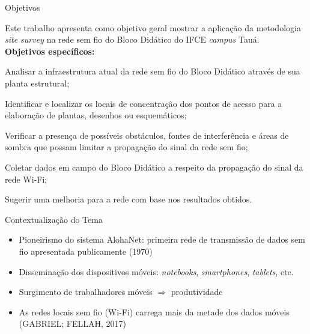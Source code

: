 \documentclass[aspectratio=169,12pt]{beamer}
\begin{document}
\begin{frame}{Objetivos}
	
	Este trabalho apresenta como objetivo geral mostrar a aplicação da metodologia \textit{site survey} na rede sem fio do Bloco Didático do IFCE \textit{campus} Tauá.\\
	
	\textbf{Objetivos específicos:}
	
	\begin{itemize}
		{\small 
			\item Analisar a infraestrutura atual da rede sem fio do Bloco Didático através de sua planta estrutural;
			
			\item Identificar e localizar os locais de concentração dos pontos de acesso para a elaboração de plantas, desenhos ou esquemáticos;
			
			\item Verificar a presença de possíveis obstáculos, fontes de interferência e áreas de sombra que possam limitar a propagação do sinal da rede sem fio;
			
			\item Coletar dados em campo do Bloco Didático a respeito da propagação do sinal da rede Wi-Fi;
			
			\item Sugerir uma melhoria para a rede com base nos resultados obtidos.
		}
	\end{itemize}
\end{frame}
\begin{frame}{Contextualização do Tema}
	\begin{itemize}
		\item Pioneirismo do sistema AlohaNet: primeira rede de transmissão de dados sem fio apresentada publicamente (1970)
	
		\item Disseminação dos dispositivos móveis: \textit{notebooks}, \textit{smartphones}, \textit{tablets}, etc.
	
		\item Surgimento de trabalhadores móveis $\Rightarrow$ produtividade
	
		\item As redes locais sem fio (Wi-Fi) carrega mais da metade dos dados móveis (GABRIEL; FELLAH, 2017)
	\end{itemize}
\end{frame}
\end{document}
